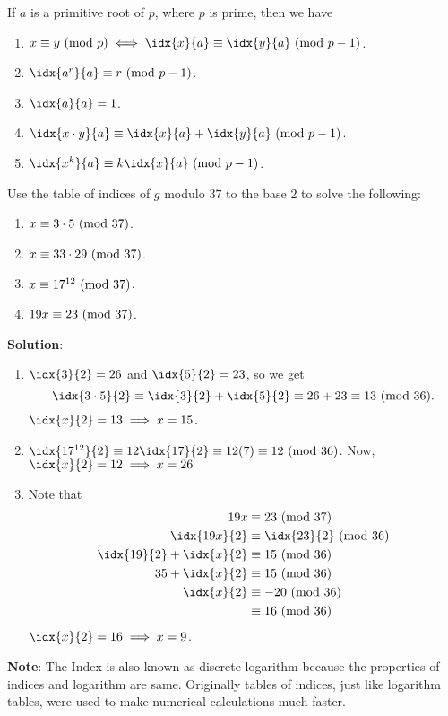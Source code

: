 \begin{Proposition}{}{}
    If $ a $ is a primitive root of $ p $, where $ p $ is prime, then we have
    \begin{enumerate}[(1)]
        \item $ x\equiv y\Mod{p}\iff \idx{x}{a}\equiv \idx{y}{a}\Mod{p-1} $.
        \item $ \idx{a^r}{a}\equiv r\Mod{p-1} $.
        \item $ \idx{a}{a}=1 $.
        \item $ \idx{x\cdot y}{a}\equiv \idx{x}{a}+\idx{y}{a}\Mod{p-1} $.
        \item $ \idx{x^k}{a}\equiv k\idx{x}{a}\Mod{p-1} $.
    \end{enumerate}
\end{Proposition}

\begin{Example}{}{}
    Use the table of indices of $ g $ modulo $ 37 $ to the base $ 2 $ to solve the following:
    \begin{enumerate}[(1)]
        \item $ x\equiv 3\cdot 5\ (\mathrm{mod}\ 37) $.
        \item $ x\equiv 33\cdot 29\ (\mathrm{mod}\ 37) $.
        \item $ x\equiv 17^{12}\ (\mathrm{mod}\ 37) $.
        \item $ 19x\equiv 23\ (\mathrm{mod}\ 37) $.
    \end{enumerate}
    \tcblower{}
    \textbf{Solution}:
    \begin{enumerate}[(1)]
        \item $ \idx{3}{2}=26 $ and $ \idx{5}{2}=23 $, so we get
              \[ \idx{3\cdot 5}{2}\equiv \idx{3}{2}+\idx{5}{2}\equiv 26+23\equiv 13\Mod{36}. \]
              $ \idx{x}{2}=13 \implies x=15 $.
        \item $ \idx{17^{12}}{2}\equiv 12\idx{17}{2}\equiv 12(7)\equiv 12\Mod{36} $. Now,
              $ \idx{x}{2}=12\implies x=26 $
        \item Note that
              \begin{align*}
                  19x                    & \equiv 23\Mod{37}         \\
                  \idx{19x}{2}           & \equiv\idx{23}{2}\Mod{36} \\
                  \idx{19}{2}+\idx{x}{2} & \equiv 15\Mod{36}         \\
                  35+\idx{x}{2}          & \equiv 15\Mod{36}         \\
                  \idx{x}{2}             & \equiv -20\Mod{36}        \\
                                         & \equiv 16\Mod{36}
              \end{align*}
              $ \idx{x}{2}=16\implies x=9 $.
    \end{enumerate}
\end{Example}
\textbf{Note}: The Index is also known as discrete logarithm because the properties
of indices and logarithm are same. Originally tables of indices, just like logarithm tables,
were used to make numerical calculations much faster.

